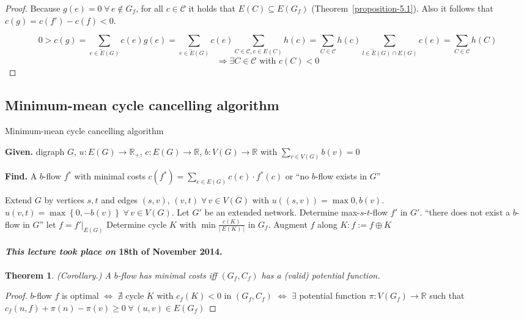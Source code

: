 \documentclass{article}
\newtheorem{theorem}{Theorem}
\newcommand{\card}[1]{\left|\:\!#1\:\!\right|}
\newcommand{\set}[1]{\left\{#1\right\}}
\newcommand{\given}[1]{\textbf{Given.} #1\par}
\newcommand{\find}[1]{\textbf{Find.} #1\par}
\newcommand{\dateref}[1]{\paragraph{\textit{This lecture took place on} #1.}}
\newcommand{\fall}{\;\forall\,}
\begin{document}
\begin{proof}
  Because $g(e) = 0 \fall e \notin G_f$, for all $c \in \mathcal{C}$ it holds that $E(C) \subseteq E(G_f)$ (Theorem~\ref{proposition-5.1}). Also it follows that $c(g) = c(f') - c(f) < 0$.

  \[
    0 > c(g)
      = \sum_{e \in \overleftrightarrow{E}(G)} c(e) g(e)
      = \sum_{e \in \overleftrightarrow{E}(G)} c(e) \sum_{C \in \mathcal{C}, e \in E(C)} h(c)
      = \sum_{C \in \mathcal{C}} h(c) \sum_{l \in \overleftrightarrow{E}(G) \cap E(G)} c(e)
      = \sum_{C \in \mathcal{C}} h(C) 
  \] \[
    \Rightarrow \exists C \in \mathcal{C} \text{ with } c(C) < 0
  \]
\end{proof}

\subsection{Minimum-mean cycle cancelling algorithm}

\begin{algorithm}
  \caption{Minimum-mean cycle cancelling algorithm}
  \label{minimum-mean-cancelling-algo}
  \given{digraph $G$, $u: E(G) \rightarrow \mathbb{R}_+$, $c: E(G) \rightarrow \mathbb{R}$, $b: V(G) \rightarrow \mathbb{R}$ with $\sum_{v \in V(G)} b(v) = 0$}
  \find{A $b$-flow $f^*$ with minimal costs $c(f^*) = \sum_{e \in E(G)} c(e) \cdot f^*(c)$ or ``no $b$-flow exists in $G$''}
\begin{algorithmic}[1]
  \State Extend $G$ by vertices $s,t$ and edges $(s, v)$, $(v, t) \fall v \in V(G)$ with $u((s,v)) = \max{0,b(v)}$. $u(v, t) = \max\set{0, -b(v)} \fall v \in V(G)$. Let $G'$ be an extended network. Determine max-$s$-$t$-flow $f'$ in $G'$.
    \State ``there does not exist a $b$-flow in $G$''
  \Else
    \State let $f = f'|_{E(G)}$
  \EndIf
    \State Determine cycle $K$ with $\min\frac{c(K)}{\card{E(K)}}$ in $G_f$.
    \State Augment $f$ along $K: f := f \oplus K$
  \EndWhile
  \State {}
\end{algorithmic}
\end{algorithm}

\dateref{18th of November 2014}

\begin{theorem}
  (Corollary.)
  A $b$-flow has minimal costs iff $(G_f, C_f)$ has a (valid) potential function.
\end{theorem}
\begin{proof}
  $b$-flow $f$ is optimal $\Leftrightarrow$ $\nexists$ cycle $K$ with $c_f(K) < 0$ in $(G_f, C_f)$
  $\Leftrightarrow$ $\exists$ potential function $\pi: V(G_f) \rightarrow \mathbb{R}$ such that $c_f(n,f) + \pi(n) - \pi(v) \geq 0 \fall (u,v) \in E(G_f)$
\end{proof}
\end{document}
